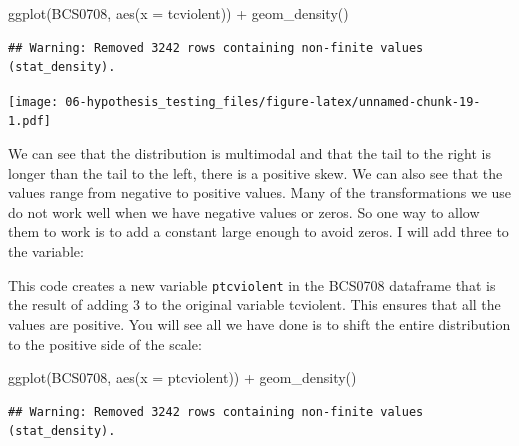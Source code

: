 \documentclass[
]{book}
\newenvironment{Shaded}{\begin{snugshade}}{\end{snugshade}}
\newcommand{\AttributeTok}[1]{\textcolor[rgb]{0.77,0.63,0.00}{#1}}
\newcommand{\DecValTok}[1]{\textcolor[rgb]{0.00,0.00,0.81}{#1}}
\newcommand{\FunctionTok}[1]{\textcolor[rgb]{0.00,0.00,0.00}{#1}}
\newcommand{\NormalTok}[1]{#1}
\newcommand{\OtherTok}[1]{\textcolor[rgb]{0.56,0.35,0.01}{#1}}
\newcommand{\SpecialCharTok}[1]{\textcolor[rgb]{0.00,0.00,0.00}{#1}}
\begin{document}
\begin{Shaded}
\begin{Highlighting}[]
\FunctionTok{ggplot}\NormalTok{(BCS0708, }\FunctionTok{aes}\NormalTok{(}\AttributeTok{x =}\NormalTok{ tcviolent)) }\SpecialCharTok{+} 
  \FunctionTok{geom\_density}\NormalTok{()}
\end{Highlighting}
\end{Shaded}

\begin{verbatim}
## Warning: Removed 3242 rows containing non-finite values (stat_density).
\end{verbatim}

\texttt{[image: 06-hypothesis\_testing\_files/figure-latex/unnamed-chunk-19-1.pdf]}

We can see that the distribution is multimodal and that the tail to the right is longer than the tail to the left, there is a positive skew. We can also see that the values range from negative to positive values. Many of the transformations we use do not work well when we have negative values or zeros. So one way to allow them to work is to add a constant large enough to avoid zeros. I will add three to the variable:

\begin{Shaded}
\end{Shaded}

This code creates a new variable \texttt{ptcviolent} in the BCS0708 dataframe that is the result of adding 3 to the original variable tcviolent. This ensures that all the values are positive. You will see all we have done is to shift the entire distribution to the positive side of the scale:

\begin{Shaded}
\begin{Highlighting}[]
\FunctionTok{ggplot}\NormalTok{(BCS0708, }\FunctionTok{aes}\NormalTok{(}\AttributeTok{x =}\NormalTok{ ptcviolent)) }\SpecialCharTok{+} 
  \FunctionTok{geom\_density}\NormalTok{()}
\end{Highlighting}
\end{Shaded}

\begin{verbatim}
## Warning: Removed 3242 rows containing non-finite values (stat_density).
\end{verbatim}
\end{document}
